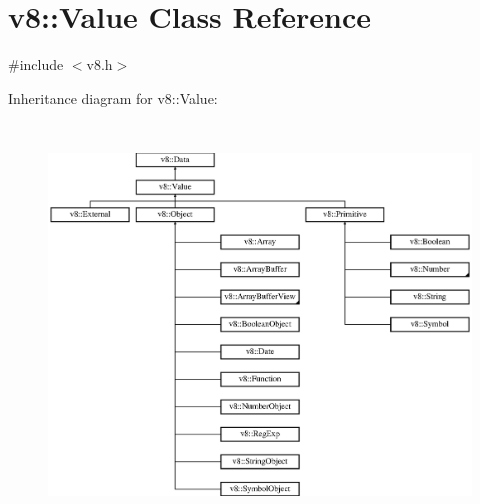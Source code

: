 \hypertarget{classv8_1_1_value}{}\section{v8\+:\+:Value Class Reference}
\label{classv8_1_1_value}


{\ttfamily \#include $<$v8.\+h$>$}

Inheritance diagram for v8\+:\+:Value\+:\begin{figure}[H]
\begin{center}
\leavevmode
\includegraphics[height=10.705883cm]{classv8_1_1_value}
\end{center}
\end{figure}
